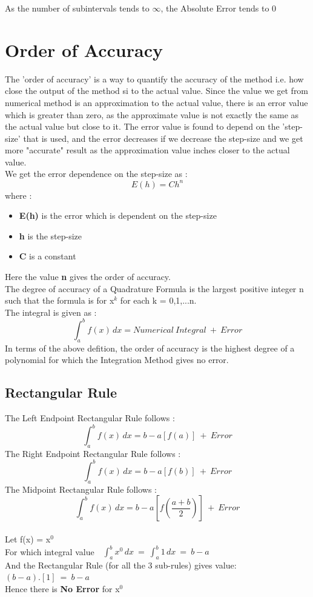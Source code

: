 \documentclass[11pt]{article}
\begin{document}
As the number of subintervals tends to $\infty$, the Absolute Error tends to 0
\pagebreak

\section{Order of Accuracy}
The 'order of accuracy' is a way to quantify the accuracy of the method i.e. how close the output of the method si to the actual value. Since the value we get from numerical method is an approximation to the actual value, there is an error value which is greater than zero, as the approximate value is not exactly the same as the actual value but close to it. The error value is found to depend on the 'step-size' that is used, and the error decreases if we decrease the step-size and we get more "accurate" result as the approximation value inches closer to the actual value.\\

We get the error dependence on the step-size as : 
\[ E(h) = Ch^n\]
where :
\begin{itemize}
	\item \textbf{E(h)} is the error which is dependent on the step-size
	\item \textbf{h} is the step-size
	\item \textbf{C} is a constant
\end{itemize}
Here the value \textbf{n} gives the order of accuracy.\\

The degree of accuracy of a Quadrature Formula is the largest positive integer n such that the formula is for x$^k$ for each k = 0,1,...n.\\

The integral is given as : 
\[ \int_{a}^{b}f(x) \,dx = Numerical~Integral~+~Error\]
In terms of the above defition, the order of accuracy is the highest degree of a polynomial for which the Integration Method gives no error.
\subsection{Rectangular Rule}
The Left Endpoint Rectangular Rule follows : 
\[\int_{a}^{b}f(x) \,dx = {b-a}[f(a)]~+~Error\]
The Right Endpoint Rectangular Rule follows : 
\[\int_{a}^{b}f(x) \,dx = {b-a}[f(b)]~+~Error\]
The Midpoint Rectangular Rule follows : 
\[\int_{a}^{b}f(x) \,dx = {b-a}[f(\frac{a+b}{2})]~+~Error\] \\

Let f(x) = x$^0$\\
For which integral value~~$\int_{a}^{b} x^0 \,dx~=~\int_{a}^{b} 1 \,dx~=~ b-a$\\
And the Rectangular Rule (for all the 3 sub-rules) gives value: $(b-a).[1]~=~b-a$ \\
Hence there is \textbf{No Error} for x$^0$ \\
\pagebreak
\end{document}
